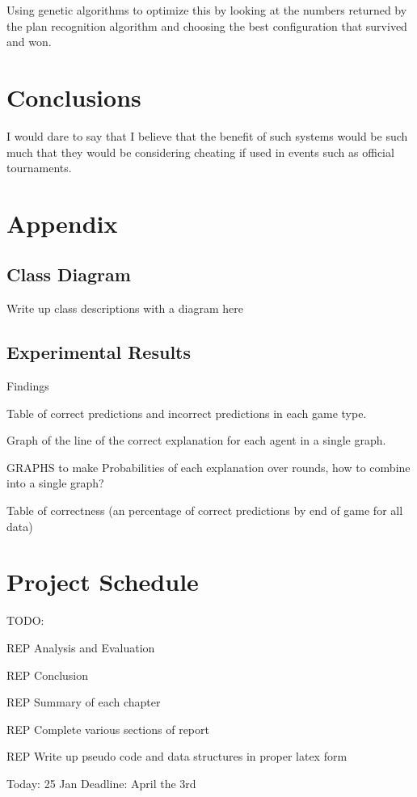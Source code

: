 \documentclass[parskip]{cs4rep}
\begin{document}
Using genetic algorithms to optimize this by looking at the numbers returned by the plan recognition algorithm and choosing the best configuration that survived and won.

\chapter{Conclusions}

I would dare to say that I believe that the benefit of such systems would be such much that they would be considering cheating if used in events such as official tournaments.

\chapter{Appendix}

\section{Class Diagram}

Write up class descriptions with a diagram here

\section{Experimental Results}

Findings

Table of correct predictions and incorrect predictions in each game type.

Graph of the line of the correct explanation for each agent in a single graph.

GRAPHS to make
Probabilities of each explanation over rounds, how to combine into a single graph?

Table of correctness (an percentage of correct predictions by end of game for all data)

\chapter{Project Schedule}

TODO: 

REP Analysis and Evaluation

REP Conclusion

REP Summary of each chapter

REP Complete various sections of report

REP Write up pseudo code and data structures  in proper latex form

Today: 25 Jan
Deadline: April the 3rd



\end{document}
